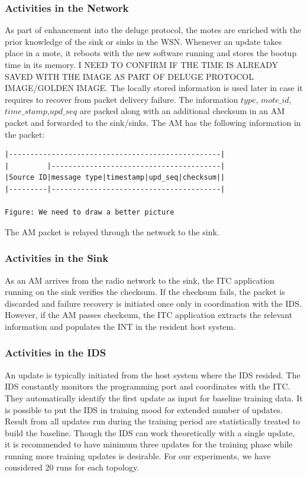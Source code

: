 \documentclass[conference,final]{IEEEtran}
\begin{document}
\subsubsection{Activities in the Network}
\label{ssc:acnet}
As part of enhancement into the deluge protocol, the motes are enriched with the prior knowledge of the sink or sinks in the WSN.
Whenever an update takes place in a mote, it reboots with the new software running and stores the bootup time in its memory.
I NEED TO CONFIRM IF THE TIME IS ALREADY SAVED WITH THE IMAGE AS PART OF DELUGE PROTOCOL IMAGE/GOLDEN IMAGE.
The locally stored information  is used later in case it requires to recover from packet delivery failure.
The information $type$, $mote\_id$,  $time\_stamp$,$upd\_seq$ are packed along with an additional checksum in an AM packet and forwarded to the sink/sinks.
The AM has the following information in the packet:
\begin{verbatim}
|--------------------------------------------------|
|         |----------------------------------------|
|Source ID|message type|timestamp|upd_seq|checksum||
|---------|----------------------------------------|

Figure: We need to draw a better picture
\end{verbatim}
The AM packet is relayed through the network to the sink.

\subsubsection{Activities in the Sink}
\label{ssc:acsink}
As an AM arrives from the radio network to the sink, the ITC application running on the sink verifies the checksum.
If the checksum fails, the packet is discarded and failure recovery is initiated once only in coordination with the IDS.
However, if the AM passes checksum, the ITC application extracts the relevant information and populates the INT in the resident host system. 

\subsubsection{Activities in the IDS}
\label{ssc:acids}
An update is typically initiated from the host system where the IDS resided.
The IDS constantly monitors the programming port and coordinates with the ITC. 
They automatically identify the first update as input for baseline training data.
It is possible to put the IDS in training mood for extended number of updates.
Result from all updates run during the training period are statistically treated to build the baseline.
Though the IDS can work theoretically with a single update, it is recommended to have minimum three updates for the training phase while running more training updates is desirable.
For our experiments, we have considered 20 runs for each topology.
\end{document}
